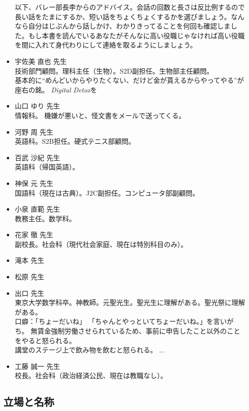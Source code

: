 \documentclass[dvipdfmx,jb5]{jarticle}
\begin{document}
\begin{itemize}
  以下、バレー部長李からのアドバイス。会話の回数と長さは反比例するので長い話をたまにするか、短い話をちょくちょくするかを選びましょう。なんなら自分はじぶんから話しかけ、わかりきってることを何回も確認しました。もし本書を読んでいるあなたがそんなに高い役職じゃなければ高い役職を間に入れて身代わりにして連絡を取るようにしましょう。

  \item 宇佐美 直也 先生\\
  技術部門顧問。理科主任（生物）。S2D副担任。生物部主任顧問。\\
  基本的に``めんどいからやりたくない、だけど金が貰えるからやってやる''が座右の銘。
  \textit{Digital Detox}を
  \item 山口 ゆり 先生\\
   情報科。
  機嫌が悪いと、怪文書をメールで送ってくる。
  \item 河野 周 先生\\
  英語科。S2B担任。硬式テニス部顧問。
  \item 百武 沙紀 先生\\
  英語科（帰国英語）。
  \item 神保 元 先生\\
  国語科（現在は古典）。J2C副担任。コンピュータ部副顧問。
  \item 小泉 直範 先生\\
  教務主任。数学科。
  \item 花家 徹 先生\\
  副校長。社会科（現代社会家庭、現在は特別科目のみ）。
  \item 滝本 先生\\
  \item 松原 先生\\
  \item 出口 先生\\
  東京大学数学科卒。神教師。元聖光生。聖光生に理解がある。聖光祭に理解がある。
  \\口癖：「ちょーだいね」
  「ちゃんとやっといてちょーだいね。」を言いがち。
  無賃金強制労働させられているため、事前に申告したこと以外のことをやると怒られる。\\
  講堂のステージ上で飲み物を飲むと怒られる。
  ...
  \item 工藤 誠一 先生\\
  校長。社会科（政治経済公民、現在は教職なし）。
\end{itemize}

\subsection{立場と名称}
\end{document}

